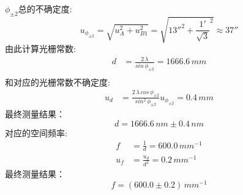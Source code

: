 \documentclass[12pt]{article}
\begin{document}
\quad $\phi_{\pm 2}$总的不确定度:
\begin{equation*}
    u_{\phi_{\pm 2}} = \sqrt{u_A^2 + u_{B1}^2} = \sqrt{13''^2 + \frac{1'}{\sqrt{3}}^2} \approx 37''
\end{equation*}
\quad 由此计算光栅常数:
\begin{equation*}
\begin{aligned}
 d&=\frac{2\, \lambda}{sin\,\phi_{\pm 2}}=1666.6\,mm \\  
\end{aligned}
\end{equation*}
\quad 和对应的光栅常数不确定度:
\begin{equation*}
    \begin{aligned}
     u_d&=\frac {2\, \lambda\, cos\,\phi_{\pm 2}}{sin^2\,\phi_{\pm 2}}u_{\phi_{\pm 2}}=0.4\,mm
    \end{aligned}
    \end{equation*}
\quad 最终测量结果：
\begin{equation}
    d = 1666.6\,nm \pm 0.4\,nm
\end{equation}
\quad 对应的空间频率:
\begin{equation*}
\begin{aligned}
    f&=\frac{1}{d}=600.0\, mm^{-1}  \\
    u_f&=\frac{u_d}{d^2}=0.2\, mm^{-1}
\end{aligned}
\end{equation*}
\quad 最终测量结果：
\begin{equation}
    f = (600.0 \pm 0.2)\,mm^{-1}
\end{equation}
\vspace{1cm}
\end{document}
